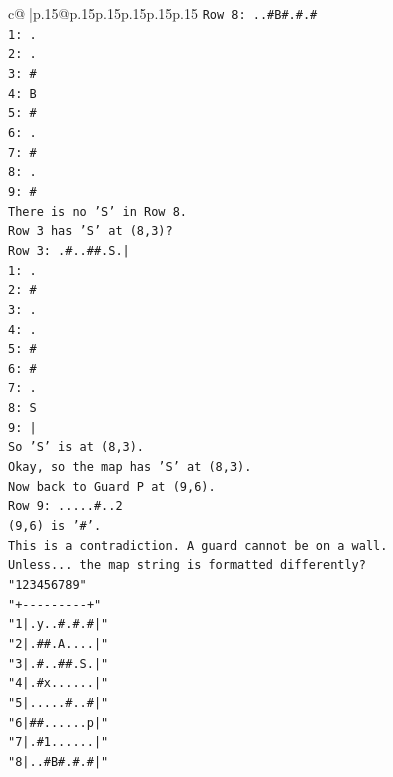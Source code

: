 \documentclass{article}
\begin{document}
{\begin{supertabular}{c@{$\;$}|p{.15\linewidth}@{}p{.15\linewidth}p{.15\linewidth}p{.15\linewidth}p{.15\linewidth}p{.15\linewidth}}
{{{\texttt{Row 8: ..\#B\#.\#.\#} \\
\texttt{1: .} \\
\texttt{2: .} \\
\texttt{3: \#} \\
\texttt{4: B} \\
\texttt{5: \#} \\
\texttt{6: .} \\
\texttt{7: \#} \\
\texttt{8: .} \\
\texttt{9: \#} \\
\texttt{There is no 'S' in Row 8.} \\
\texttt{Row 3 has 'S' at (8,3)?} \\
\texttt{Row 3: .\#..\#\#.S.|} \\
\texttt{1: .} \\
\texttt{2: \#} \\
\texttt{3: .} \\
\texttt{4: .} \\
\texttt{5: \#} \\
\texttt{6: \#} \\
\texttt{7: .} \\
\texttt{8: S} \\
\texttt{9: |} \\
\texttt{So 'S' is at (8,3).} \\
\texttt{Okay, so the map has 'S' at (8,3).} \\
\texttt{Now back to Guard P at (9,6).} \\
\texttt{Row 9: .....\#..2} \\
\texttt{(9,6) is '\#'.} \\
\texttt{This is a contradiction. A guard cannot be on a wall.} \\
\texttt{Unless... the map string is formatted differently?} \\
\texttt{"123456789"} \\
\texttt{"+{-}{-}{-}{-}{-}{-}{-}{-}{-}+"} \\
\texttt{"1|.y..\#.\#.\#|"} \\
\texttt{"2|.\#\#.A....|"} \\
\texttt{"3|.\#..\#\#.S.|"} \\
\texttt{"4|.\#x......|"} \\
\texttt{"5|.....\#..\#|"} \\
\texttt{"6|\#\#......p|"} \\
\texttt{"7|.\#1......|"} \\
\texttt{"8|..\#B\#.\#.\#|"} \\
}}}
\end{supertabular}}
\end{document}
